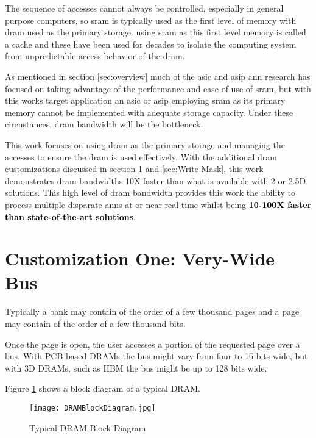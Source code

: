The sequence of accesses cannot always be controlled, especially in general purpose computers, so \ac{sram} is typically used as the first level of memory with \ac{dram} used as the primary storage. 
using \ac{sram} as this first level memory is called a cache and these have been used for decades to isolate the computing system from unpredictable access behavior of the \ac{dram}.

As mentioned in section \ref{sec:overview} much of the \ac{asic} and \ac{asip} \ac{ann} research has focused on taking advantage of the performance and ease of use of \ac{sram}, but with this works target application an \ac{asic} or \ac{asip} employing \ac{sram} as its primary memory cannot be implemented with adequate storage capacity.
Under these circustances, \ac{dram} bandwidth will be the bottleneck.

This work focuses on using \ac{dram} as the primary storage and managing the accesses to ensure the \ac{dram} is used effectively. 
With the additional \ac{dram} customizations discussed in section \ref{sec:Very-Wide Bus} and \ref{sec:Write Mask}, this work demonstrates \ac{dram} bandwidths 10X faster than what is available with 2 or 2.5D solutions.
This high level of \ac{dram} bandwidth provides this work the ability to process multiple disparate \acp{ann} at or near real-time whilst being \textbf{\textcolor{black}{10-100X faster than state-of-the-art solutions}}.


\section{Customization One: Very-Wide Bus}
\label{sec:Very-Wide Bus}

Typically a bank may contain of the order of a few thousand pages and a page may contain of the order of a few thousand bits.

Once the page is open, the user accesses a portion of the requested page over a bus. With PCB based DRAMs the bus might vary from four to 16 bits wide, but with 3D DRAMs, such as HBM the bus might be up to 128 bits wide.

Figure \ref{fig:dramBlockDiagram} shows a block diagram of a typical DRAM.

\begin{figure}[!t]
\centering
\captionsetup{justification=centering}
\centerline{
\mbox{\texttt{[image: DRAMBlockDiagram.jpg]}}
}
\caption{Typical DRAM Block Diagram}
\label{fig:dramBlockDiagram}
\end{figure}

